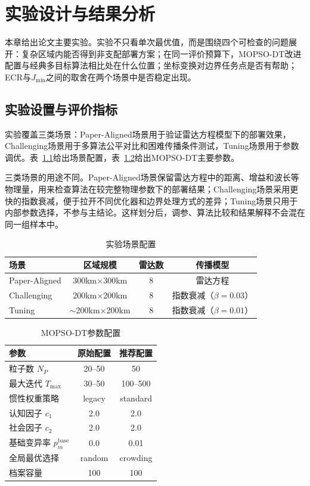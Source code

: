 \chapter{实验设计与结果分析}\label{chap:experiments}

本章给出论文主要实验。实验不只看单次最优值，而是围绕四个可检查的问题展开：复杂区域内能否得到非支配部署方案；在同一评价预算下，MOPSO-DT改进配置与经典多目标算法相比处在什么位置；坐标变换对边界任务点是否有帮助；ECR与$J_{\min}$之间的取舍在两个场景中是否稳定出现。
\section{实验设置与评价指标}

实验覆盖三类场景：Paper-Aligned场景用于验证雷达方程模型下的部署效果，Challenging场景用于多算法公平对比和困难传播条件测试，Tuning场景用于参数调优。表~\ref{tab:scenarios}给出场景配置，表~\ref{tab:mopso_params}给出MOPSO-DT主要参数。

三类场景的用途不同。Paper-Aligned场景保留雷达方程中的距离、增益和波长等物理量，用来检查算法在较完整物理参数下的部署结果；Challenging场景采用更快的指数衰减，便于拉开不同优化器和边界处理方式的差异；Tuning场景只用于内部参数选择，不参与主结论。这样划分后，调参、算法比较和结果解释不会混在同一组样本中。

\begin{table}[!htbp]
\centering
\small
\caption{实验场景配置}
\label{tab:scenarios}
\begin{tabular}{lccc}
\toprule
场景 & 区域规模 & 雷达数 & 传播模型 \\
\midrule
Paper-Aligned & 300km$\times$300km & 8 & 雷达方程 \\
Challenging & 200km$\times$200km & 8 & 指数衰减（$\beta=0.03$） \\
Tuning & $\sim$200km$\times$200km & 8 & 指数衰减（$\beta=0.01$） \\
\bottomrule
\end{tabular}
\end{table}
\begin{table}[!htbp]
\centering
\small
\caption{MOPSO-DT参数配置}
\label{tab:mopso_params}
\begin{tabular}{lcc}
\toprule
参数 & 原始配置 & 推荐配置 \\
\midrule
粒子数 $N_P$ & 20--50 & 50 \\
最大迭代 $T_{\max}$ & 30--50 & 100--500 \\
惯性权重策略 & legacy & standard \\
认知因子 $c_1$ & 2.0 & 2.0 \\
社会因子 $c_2$ & 2.0 & 2.0 \\
基础变异率 $p_m^{\text{base}}$ & 0.0 & 0.01 \\
全局最优选择 & random & crowding \\
档案容量 & 100 & 100 \\
\bottomrule
\end{tabular}
\end{table}

